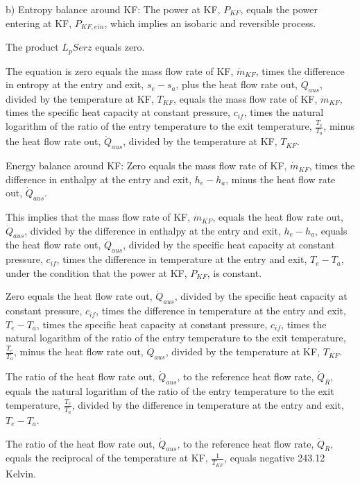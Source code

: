 b) 
Entropy balance around KF:
The power at KF, \( P_{KF} \), equals the power entering at KF, \( P_{KF,ein} \), which implies an isobaric and reversible process.

The product \( L_p Serz \) equals zero.

The equation is zero equals the mass flow rate of KF, \( \dot{m}_{KF} \), times the difference in entropy at the entry and exit, \( s_e - s_a \), plus the heat flow rate out, \( \dot{Q}_{aus} \), divided by the temperature at KF, \( T_{KF} \), equals the mass flow rate of KF, \( \dot{m}_{KF} \), times the specific heat capacity at constant pressure, \( c_{if} \), times the natural logarithm of the ratio of the entry temperature to the exit temperature, \( \frac{T_e}{T_a} \), minus the heat flow rate out, \( \dot{Q}_{aus} \), divided by the temperature at KF, \( T_{KF} \).

Energy balance around KF:
Zero equals the mass flow rate of KF, \( \dot{m}_{KF} \), times the difference in enthalpy at the entry and exit, \( h_e - h_a \), minus the heat flow rate out, \( \dot{Q}_{aus} \).

This implies that the mass flow rate of KF, \( \dot{m}_{KF} \), equals the heat flow rate out, \( \dot{Q}_{aus} \), divided by the difference in enthalpy at the entry and exit, \( h_e - h_a \), equals the heat flow rate out, \( \dot{Q}_{aus} \), divided by the specific heat capacity at constant pressure, \( c_{if} \), times the difference in temperature at the entry and exit, \( T_e - T_a \), under the condition that the power at KF, \( P_{KF} \), is constant.

Zero equals the heat flow rate out, \( \dot{Q}_{aus} \), divided by the specific heat capacity at constant pressure, \( c_{if} \), times the difference in temperature at the entry and exit, \( T_e - T_a \), times the specific heat capacity at constant pressure, \( c_{if} \), times the natural logarithm of the ratio of the entry temperature to the exit temperature, \( \frac{T_e}{T_a} \), minus the heat flow rate out, \( \dot{Q}_{aus} \), divided by the temperature at KF, \( T_{KF} \).

The ratio of the heat flow rate out, \( \dot{Q}_{aus} \), to the reference heat flow rate, \( \dot{Q}_R \), equals the natural logarithm of the ratio of the entry temperature to the exit temperature, \( \frac{T_e}{T_a} \), divided by the difference in temperature at the entry and exit, \( T_e - T_a \).

The ratio of the heat flow rate out, \( \dot{Q}_{aus} \), to the reference heat flow rate, \( \dot{Q}_R \), equals the reciprocal of the temperature at KF, \( \frac{1}{T_{KF}} \), equals negative 243.12 Kelvin.